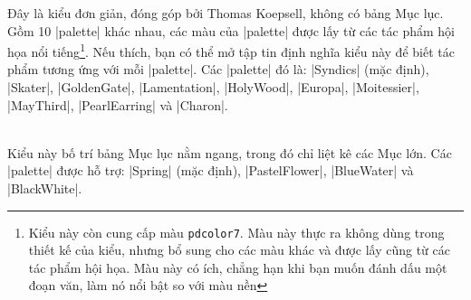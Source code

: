 \begin{description}
Đây là kiểu đơn giản, đóng góp bởi Thomas Koepsell, không có bảng Mục lục.
Gồm 10 |palette| khác nhau, các màu của |palette| được lấy từ các tác phẩm
hội họa nổi tiếng\footnote{%
Kiểu này còn cung cấp màu \texttt{pdcolor7}. Màu này thực ra không dùng trong
thiết kế của kiểu, nhưng bổ sung cho các màu khác và được lấy cũng từ các tác phẩm
hội họa. Màu này có ích, chẳng hạn khi bạn muốn đánh dấu một đoạn văn, làm
nó nổi bật so với màu nền}. Nếu thích, bạn có thể mở tập tin định nghĩa kiểu này
để biết tác phẩm tương ứng với mỗi |palette|. Các |palette| đó là:
|Syndics| (mặc định), |Skater|, |GoldenGate|, |Lamentation|,
|HolyWood|, |Europa|, |Moitessier|, |MayThird|, |PearlEarring| và |Charon|.
\\
\item{}\\
Kiểu này bố trí bảng Mục lục nằm ngang, trong đó chỉ liệt kê các Mục lớn.
Các |palette| được hỗ trợ: |Spring| (mặc định), |PastelFlower|, |BlueWater|
và |BlackWhite|.
\\
\end{description}
\endinput
